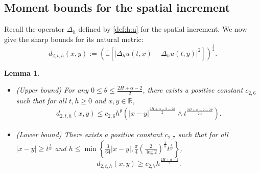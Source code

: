 \documentclass[11pt,reqno]{amsart}
\numberwithin{equation}{section}
\newtheorem{lemma}{Lemma}[section]
\def\EE{\mathbb{E}}
\newcommand{\1}{{\bf 1}}
\newcommand{\2}{{\bf 2}}
\newcommand{\lc}{\left(}
\newcommand{\rc}{\right)}
\begin{document}
\subsection{Moment bounds for the spatial increment}
Recall the operator $ \Delta_h$ defined by \eqref{def:h:u} for the  spatial increment.  We now  give the sharp bounds for  its natural metric:
    \begin{equation}\label{eq d2}
    d_{2,t,h}(x,y):=\left(\EE\left[| \Delta _h u(t,x)- \Delta _h u(t,y)|^2\right]\right)^{\frac12}.
  \end{equation}
\begin{lemma}\label{lem 2space} 
 \begin{itemize}
 \item[(a)](Upper bound)
 For any $0\leq\theta\leq\frac{2H+\alpha-2}{2}$,
 there exists a positive constant $c_{2,6}$ such that  for all $t, h\ge 0$ and $x, y\in \mathbb R$,
   \begin{align}\label{U-h-Eu-3}
   d_{2, t,h}(x,y)\leq c_{2,6}h^{\theta}\lc|x-y|^{\frac{2H+\alpha-2-2\theta}{2}}\wedge t^{\frac{2H+\alpha-2-2\theta}{2\alpha}}\rc.
 \end{align}
 \item[(b)](Lower bound)
  There exists a positive constant $c_{2,7}$ such that for all $|x-y|\geq t^{\frac1{\alpha}}$
  and
   $h\le \min\left\{\frac{3}{64}|x-y|, \frac{\pi}{4}\lc\frac{2}{\log 2}\rc^{\frac{1}{\alpha}}t^{\frac{1}{\alpha}}\right\}$,
  \begin{equation}\label{U-h-dEu}
       d_{2, t,h}(x,y)\geq  c_{2,7}h^{\frac{2H+\alpha-2}{2}}.
  \end{equation}
   \end{itemize}
 \end{lemma}
\end{document}
